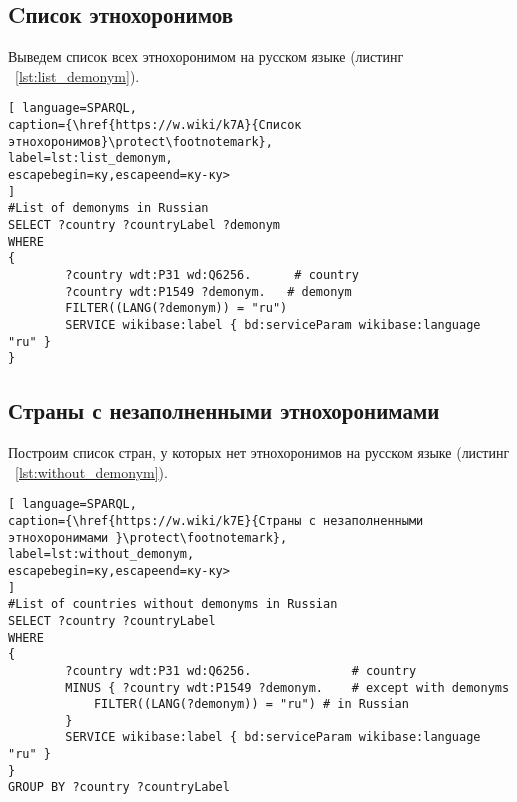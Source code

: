 

\subsection{Cписок этнохоронимов}


Выведем список всех этнохоронимом на русском языке (листинг ~\ref{lst:list_demonym}).

\begin{lstlisting}[ language=SPARQL, 
caption={\href{https://w.wiki/k7A}{Cписок этнохоронимов}\protect\footnotemark},
label=lst:list_demonym, 
escapebegin=ку,escapeend=ку-ку>
]
#List of demonyms in Russian
SELECT ?country ?countryLabel ?demonym
WHERE
{
		?country wdt:P31 wd:Q6256.      # country
		?country wdt:P1549 ?demonym.   # demonym
		FILTER((LANG(?demonym)) = "ru")
		SERVICE wikibase:label { bd:serviceParam wikibase:language "ru" }
}
\end{lstlisting}


\subsection{Страны с незаполненными этнохоронимами}

Построим список стран, у которых нет этнохоронимов на русском языке (листинг ~\ref{lst:without_demonym}).
\begin{lstlisting}[ language=SPARQL, 
caption={\href{https://w.wiki/k7E}{Страны с незаполненными этнохоронимами }\protect\footnotemark},
label=lst:without_demonym, 
escapebegin=ку,escapeend=ку-ку>
]
#List of countries without demonyms in Russian
SELECT ?country ?countryLabel 
WHERE
{
		?country wdt:P31 wd:Q6256.              # country
		MINUS { ?country wdt:P1549 ?demonym.    # except with demonyms
			FILTER((LANG(?demonym)) = "ru") # in Russian
		}    
		SERVICE wikibase:label { bd:serviceParam wikibase:language "ru" }
}
GROUP BY ?country ?countryLabel
\end{lstlisting}


